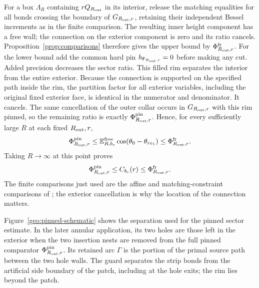 For a box \(\Lambda_R\) containing \(rQ_{R_{\rm out}}\) in its interior, release
the matching equalities for all bonds crossing the boundary of
\(G_{R_{\rm out},r}\), retaining their independent Bessel increments as in the
finite comparison.  The resulting inner height component has a free
wall; the connection on the exterior component is zero and its ratio
cancels.  Proposition~\ref{prop:comparisons} therefore gives the upper
bound by \(\Phi_{R_{\rm out},r}^{\rm fr}\).  For the lower bound add the
common hard pin \(h_{\mathsf F_{R_{\rm out},r}}=0\) before making any cut.  Added precision
decreases the sector ratio.  This filled rim separates the interior
from the entire exterior.  Because the connection is supported on the
specified path inside the rim, the partition factor for all exterior
variables, including the original fixed exterior face, is identical in
the numerator and denominator.  It cancels.  The same cancellation of
the outer collar occurs in \(G_{R_{\rm out},r}\) with this rim pinned,
so the remaining ratio is exactly \(\Phi_{R_{\rm out},r}^{\rm pin}\).
Hence, for every sufficiently
large \(R\) at each fixed \(R_{\rm out},r\),
\[
 \Phi_{R_{\rm out},r}^{\rm pin}\le
 \mathbb E^{\rm free}_{R,b_c}\cos(\theta_0-\theta_{re_1})
 \le \Phi_{R_{\rm out},r}^{\rm fr}.
\]
Taking \(R\to\infty\) at this point proves
\begin{equation}\label{geo:thermodynamic-bracket}
 \Phi_{R_{\rm out},r}^{\rm pin}\le C_{b_c}(r)
                                    \le \Phi_{R_{\rm out},r}^{\rm fr}.
\end{equation}
The finite comparisons just used are the affine and matching-constraint
comparisons of \cite[Lemma~2.2]{C}; the exterior cancellation is why the
location of the connection matters.

Figure~\ref{geo:pinned-schematic} shows the separation used for the
pinned sector estimate.  In the later annular application, its two holes
are those left in the exterior when the two insertion nests are removed
from the full pinned comparator \(\Phi_{R_{\rm out},r}^{\rm pin}\).
Its retained arc \(\Gamma\) is the portion
of the primal source path between the two hole walls.  The guard
separates the strip bonds from the artificial side boundary of the patch,
including at the hole exits; the rim lies beyond the patch.

